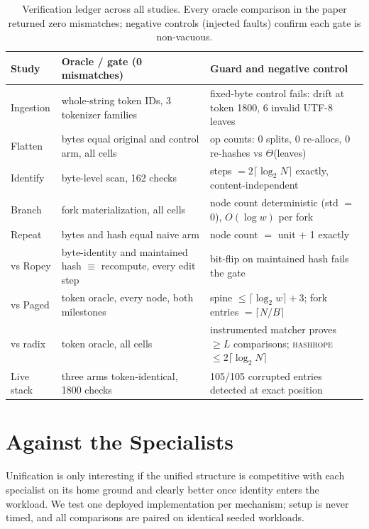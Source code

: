 \documentclass[10pt,conference]{IEEEtran}
\newcommand{\hr}{\textsc{hashrope}}
\begin{document}
\begin{table}[t]
\caption{Verification ledger across all studies. Every oracle
comparison in the paper returned zero mismatches; negative controls
(injected faults) confirm each gate is non-vacuous.}
\label{tab:ledger}
\centering
\footnotesize
\begin{tabular}{@{}p{1.55cm}p{2.6cm}p{2.9cm}@{}}
\toprule
Study & Oracle / gate (0 mismatches) & Guard and negative control \\
\midrule
Ingestion & whole-string token IDs, 3 tokenizer families & fixed-byte control fails: drift at token 1800, 6 invalid UTF-8 leaves \\
Flatten & bytes equal original and control arm, all cells & op counts: 0 splits, 0 re-allocs, 0 re-hashes vs $\Theta$(leaves) \\
Identify & byte-level scan, 162 checks & steps $= 2\lceil\log_2 N\rceil$ exactly, content-independent \\
Branch & fork materialization, all cells & node count deterministic (std $=$ 0), $O(\log w)$ per fork \\
Repeat & bytes and hash equal naive arm & node count $=$ unit $+$ 1 exactly \\
vs Ropey & byte-identity and maintained hash $\equiv$ recompute, every edit step & bit-flip on maintained hash fails the gate \\
vs Paged & token oracle, every node, both milestones & spine $\le \lceil\log_2 w\rceil{+}3$; fork entries $= \lceil N/B\rceil$ \\
vs radix & token oracle, all cells & instrumented matcher proves $\ge L$ comparisons; \hr{} $\le 2\lceil\log_2 N\rceil$ \\
Live stack & three arms token-identical, 1800 checks & 105/105 corrupted entries detected at exact position \\
\bottomrule
\end{tabular}
\end{table}

\section{Against the Specialists}\label{sec:competitive}

Unification is only interesting if the unified structure is competitive
with each specialist on its home ground and clearly better once
identity enters the workload. We test one deployed implementation per
mechanism; setup is never timed, and all comparisons are paired on
identical seeded workloads.
\end{document}
